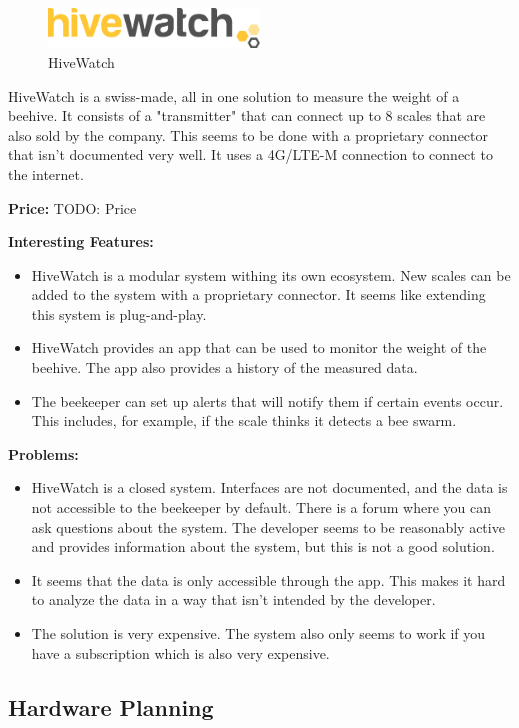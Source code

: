 \begin{figure}
    \centering
    \includegraphics[width=0.5\textwidth]{figures/hivewatch_logo.png}
    \caption{HiveWatch}
    \label{fig:hivewatch}
\end{figure}
HiveWatch is a swiss-made, all in one solution to measure the weight of a beehive. It consists of a "transmitter" that can connect up to 8 scales that are also sold by the company. This seems to be done with a proprietary connector that isn't documented very well. It uses a 4G/LTE-M connection to connect to the internet.


\textbf{Price:}
TODO: Price

\textbf{Interesting Features:}
\begin{itemize}
    \item HiveWatch is a modular system withing its own ecosystem. New scales can be added to the system with a proprietary connector. It seems like extending this system is plug-and-play.
    \item HiveWatch provides an app that can be used to monitor the weight of the beehive. The app also provides a history of the measured data.
    \item The beekeeper can set up alerts that will notify them if certain events occur. This includes, for example, if the scale thinks it detects a bee swarm.
\end{itemize}
\textbf{Problems:}
\begin{itemize}
    \item HiveWatch is a closed system. Interfaces are not documented, and the data is not accessible to the beekeeper by default. There is a forum where you can ask questions about the system. The developer seems to be reasonably active and provides information about the system, but this is not a good solution.
    \item It seems that the data is only accessible through the app. This makes it hard to analyze the data in a way that isn't intended by the developer.
    \item The solution is very expensive. The system also only seems to work if you have a subscription which is also very expensive.
\end{itemize}

\newpage

\subsection{Hardware Planning}


